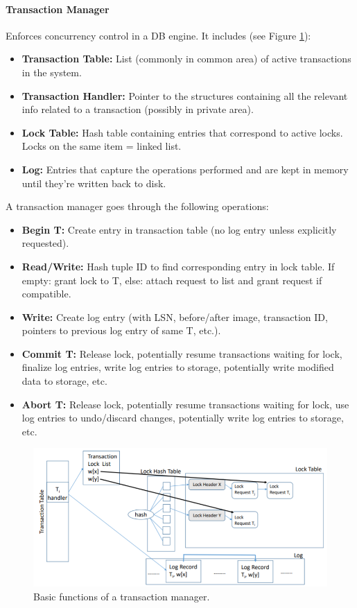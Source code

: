 \paragraph{Transaction Manager}
Enforces concurrency control in a DB engine. It includes (see Figure \ref{fig:manager}):
\begin{itemize}
    \item \textbf{Transaction Table:} List (commonly in common area) of active transactions in the system.
    \item \textbf{Transaction Handler:} Pointer to the structures containing all the relevant info related to a transaction (possibly in private area).
    \item \textbf{Lock Table:} Hash table containing entries that correspond to active locks. Locks on the same item = linked list.
    \item \textbf{Log:} Entries that capture the operations performed and are kept in memory until they're written back to disk.
\end{itemize}
A transaction manager goes through the following operations:
\begin{itemize}
    \item \textbf{Begin T:} Create entry in transaction table (no log entry unless explicitly requested).
    \item \textbf{Read/Write:} Hash tuple ID to find corresponding entry in lock table. If empty: grant lock to T, else: attach request to list and grant request if compatible.
    \item \textbf{Write:} Create log entry (with LSN, before/after image, transaction ID, pointers to previous log entry of same T, etc.).
    \item \textbf{Commit T:} Release lock, potentially resume transactions waiting for lock, finalize log entries, write log entries to storage, potentially write modified data to storage, etc.
    \item \textbf{Abort T:} Release lock, potentially resume transactions waiting for lock, use log entries to undo/discard changes, potentially write log entries to storage, etc.
\end{itemize}

\begin{figure}[h]
	\centering
	\includegraphics[scale=0.7]{images/4-manager.PNG}
	\caption{Basic functions of a transaction manager.}
	\label{fig:manager}
\end{figure}

